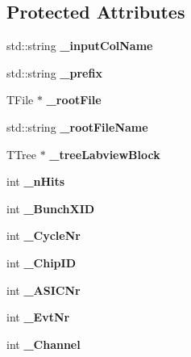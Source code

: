 \subsection*{Protected Attributes}
\begin{DoxyCompactItemize}
\item 
std\-::string {\bfseries \-\_\-input\-Col\-Name}\label{classCALICE_1_1RootTreeGenerator_a45697ed70cf6e099a2020dd714504e97}

\item 
std\-::string {\bfseries \-\_\-prefix}\label{classCALICE_1_1RootTreeGenerator_a40fa892791255b3cf185ae01fc1df8a8}

\item 
T\-File $\ast$ {\bfseries \-\_\-root\-File}\label{classCALICE_1_1RootTreeGenerator_aedbcdb07e45e1b40d7cd8212cba0629f}

\item 
std\-::string {\bfseries \-\_\-root\-File\-Name}\label{classCALICE_1_1RootTreeGenerator_ac0f4cfe564f803f8c1c3ced97d8ce0d1}

\item 
T\-Tree $\ast$ {\bfseries \-\_\-tree\-Labview\-Block}\label{classCALICE_1_1RootTreeGenerator_a9a706fe7be21b16d3a4a8fd1f58ced1f}

\item 
int {\bfseries \-\_\-n\-Hits}\label{classCALICE_1_1RootTreeGenerator_afeb6f7f6fa7f8f90f98556dab8e4843e}

\item 
int {\bfseries \-\_\-\-Bunch\-X\-I\-D}\label{classCALICE_1_1RootTreeGenerator_a263bd06e050d66020d71346b7fe17f94}

\item 
int {\bfseries \-\_\-\-Cycle\-Nr}\label{classCALICE_1_1RootTreeGenerator_a7a11796d640791a6015a9ef546c828cb}

\item 
int {\bfseries \-\_\-\-Chip\-I\-D}\label{classCALICE_1_1RootTreeGenerator_acff8c71e037b9886df76290fd718a2fc}

\item 
int {\bfseries \-\_\-\-A\-S\-I\-C\-Nr}\label{classCALICE_1_1RootTreeGenerator_a2fa8cff4b18af909633f82a4abb417f3}

\item 
int {\bfseries \-\_\-\-Evt\-Nr}\label{classCALICE_1_1RootTreeGenerator_a5ecdacceba84880bda93af94d9ed8e64}

\item 
int {\bfseries \-\_\-\-Channel}\label{classCALICE_1_1RootTreeGenerator_ac5c4be539f3cca086c6e84861b7dc1fc}


\end{DoxyCompactItemize}
